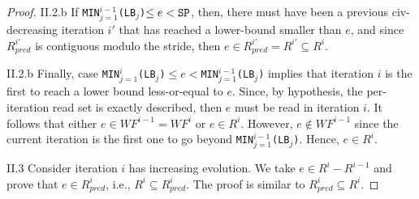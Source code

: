 \documentclass{sig-alternate}
\begin{document}
\begin{theorem}
\begin{proof}
II.2.b If {\tt{}MIN$_{j=1}^{i-1}$(LB$_j$)}$ \le e < {\tt{}SP}$, then, 
there must have been a previous {\sc civ}-decreasing iteration $i'$ that has
reached a lower-bound smaller than $e$, and since $R_{pred}^{i'}$ is contiguous
modulo the stride, then $e \in R_{pred}^{i'} = R^{i'} \subseteq R^{i}$.  \vspace{1ex}

II.2.b Finally, case {\tt{}MIN$_{j=1}^{i}$(LB$_j$)}$\le e < ${\tt{}MIN$_{j=1}^{i-1}$(LB$_j$)}
implies that iteration $i$ is the first to reach a lower bound less-or-equal to $e$.
Since, by hypothesis, the per-iteration read set is exactly described, then $e$ must 
be read in iteration $i$. It follows that either $e \in WF^{i-1}=WF^{i}$
or $e \in R^i$. However, $e \not\in WF^{i-1}$ since the current iteration is the first one
to go beyond {\tt{}MIN$_{j=1}^{i-1}$(LB$_j$)}.  Hence, $e \in R^i$. 
\vspace{1ex}

II.3 Consider iteration $i$ has increasing evolution. We take $e \in R^{i} - R^{i-1}$
and prove that $e \in R_{pred}^{i}$, i.e., $R^i \subseteq R_{pred}^{i} $. 
The proof is similar to $R_{pred}^{i} \subseteq R^i$.
\end{proof}
\end{theorem}
\end{document}
